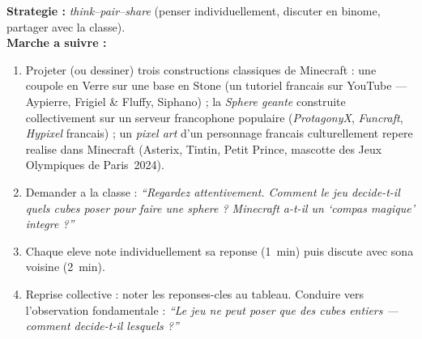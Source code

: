 \documentclass[12pt,a4paper]{scrartcl}
\newcommand{\tempo}[1]{\textnormal{\footnotesize\color{bg!90!white}\textsf{#1}}}
\begin{document}
\begin{activite}[1.1 --- Mobilisation \quad\tempo{10 min}]
\textbf{Strategie :} \emph{think--pair--share} (penser individuellement, discuter en binome, partager avec la classe). \\[0.4em]
\textbf{Marche a suivre :}
\begin{enumerate}[leftmargin=1.5em,itemsep=0.2em,topsep=0.3em,nosep]
  \item Projeter (ou dessiner) trois constructions classiques de Minecraft : une coupole en Verre sur une base en Stone (un tutoriel francais sur YouTube --- Aypierre, Frigiel \& Fluffy, Siphano) ; la \emph{Sphere geante} construite collectivement sur un serveur francophone populaire (\emph{ProtagonyX}, \emph{Funcraft}, \emph{Hypixel} francais) ; un \emph{pixel art} d'un personnage francais culturellement repere realise dans Minecraft (Asterix, Tintin, Petit Prince, mascotte des Jeux Olympiques de Paris~2024).
  \item Demander a la classe : \emph{\enquote{Regardez attentivement. Comment le jeu decide-t-il quels cubes poser pour faire une sphere ? Minecraft a-t-il un \enquote{compas magique} integre ?}}
  \item Chaque eleve note individuellement sa reponse (1~min) puis discute avec son\textperiodcentered a voisin\textperiodcentered e (2~min).
  \item Reprise collective : noter les reponses-cles au tableau. Conduire vers l'observation fondamentale : \emph{\enquote{Le jeu ne peut poser que des cubes entiers --- comment decide-t-il lesquels ?}}
\end{enumerate}
\end{activite}
\end{document}
